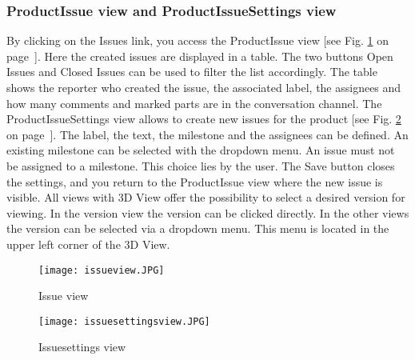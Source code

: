     \subsubsection*{ProductIssue view and ProductIssueSettings view}
    By clicking on the Issues link, you access the ProductIssue view [see Fig. \ref{fig: issueview} on page~\pageref{fig: issueview}]. Here the created issues are displayed in a table. The two buttons Open Issues and Closed Issues can be used to filter the list accordingly. The table shows the reporter who created the issue, the associated label, the assignees and how many comments and marked parts are in the conversation channel. The ProductIssueSettings view allows to create new issues for the product [see Fig. \ref{fig: issuesettingsview} on page~\pageref{fig: issuesettingsview}]. The label, the text, the milestone and the assignees can be defined. An existing milestone can be selected with the dropdown menu. An issue must not be assigned to a milestone. This choice lies by the user. The Save button closes the settings, and you return to the ProductIssue view where the new issue is visible. All views with 3D View offer the possibility to select a desired version for viewing. In the version view the version can be clicked directly. In the other views the version can be selected via a dropdown menu. This menu is located in the upper left corner of the 3D View.
    
    \begin{figure}[h]
        \centering
        \texttt{[image: issueview.JPG]}
        \caption{Issue view}
        \label{fig: issueview}
    \end{figure}

    \begin{figure}[h]
        \centering
        \texttt{[image: issuesettingsview.JPG]}
        \caption{Issuesettings view}
        \label{fig: issuesettingsview}
    \end{figure}

